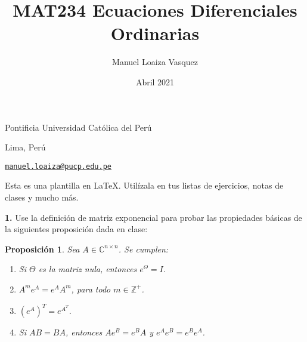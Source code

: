 \documentclass{article}
\title{MAT234 Ecuaciones Diferenciales Ordinarias}
\author{Manuel Loaiza Vasquez}
\date{Abril 2021}
\newenvironment{statement}[1]{\smallskip\noindent\color[rgb]{1.00,0.00,0.50} {\bf #1.}}{}
\newtheorem*{proposition}{Proposici\'on}
\theoremstyle{definition}
\theoremstyle{remark}
\newcommand{\BC}{\mathbb C}
\newcommand{\BZ}{\mathbb Z}
\begin{document}
\maketitle

\vspace*{-0.25in}
\centerline{Pontificia Universidad Cat\'olica del Per\'u}
\centerline{Lima, Per\'u}
\centerline{\href{mailto:manuel.loaiza@pucp.edu.pe}{{\tt manuel.loaiza@pucp.edu.pe}}}
\vspace*{0.15in}

\begin{framed}
  Esta es una plantilla en \LaTeX. Util\'izala en tus listas de ejercicios, notas de clases y mucho m\'as.
\end{framed}

\begin{statement}{1}
  Use la definici\'on de matriz exponencial para probar las propiedades b\'asicas
  de la siguientes proposici\'on dada en clase:
\end{statement}

\begin{proposition}
  Sea $A \in \BC^{n \times n}$. Se cumplen:
  \begin{enumerate}
    \item Si $\Theta$ es la matriz nula, entonces $e^{\Theta} = I$.
    \item $A^m e^A = e^A A^m$, para todo $m \in \BZ^+$.
    \item $(e^A)^T = e^{A^T}$.
    \item Si $AB = BA$, entonces $A e^B = e^B A$ y $e^A e^B = e^B e^A$.
  \end{enumerate}
\end{proposition}
\end{document}
